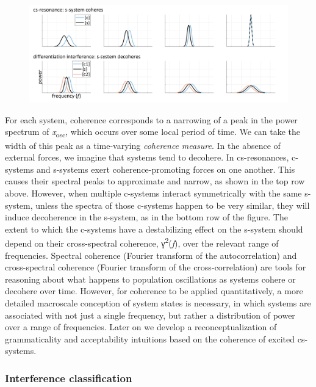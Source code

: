  
\begin{figure}
\includegraphics[width=\textwidth]{figures/Tilsen-img93.png}
\caption{\missingcaption}
\label{fig:}
\end{figure}
 

  For each system, coherence corresponds to a narrowing of a peak in the power spectrum of \textit{x}\textsubscript{osc}, which occurs over some local period of time. We can take the width of this peak as a time-varying \textit{coherence} \textit{measure}. In the absence of external forces, we imagine that systems tend to decohere. In cs-resonances, c-systems and s-systems exert coherence-promoting forces on one another. This causes their spectral peaks to approximate and narrow, as shown in the top row above. However, when multiple c-systems interact symmetrically with the same s-system, unless the spectra of those c-systems happen to be very similar, they will induce decoherence in the s-system, as in the bottom row of the figure. The extent to which the c-systems have a destabilizing effect on the s-system should depend on their cross-spectral coherence, γ\textsuperscript{2}(\textit{f}), over the relevant range of frequencies. Spectral coherence (Fourier transform of the autocorrelation) and cross-spectral coherence (Fourier transform of the cross-correlation) are tools for reasoning about what happens to population oscillations as systems cohere or decohere over time. However, for coherence to be applied quantitatively, a more detailed macroscale conception of system states is necessary, in which systems are associated with not just a single frequency, but rather a distribution of power over a range of frequencies. Later on we develop a reconceptualization of grammaticality and acceptability intuitions based on the coherence of excited cs-systems.

\subsubsection{Interference classification}

